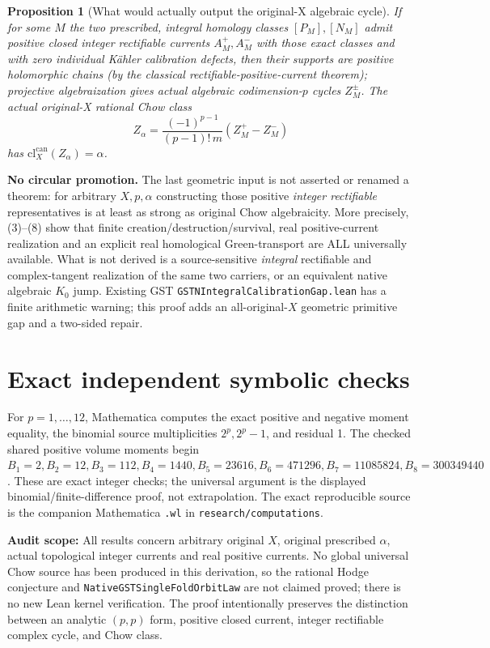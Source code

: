 \documentclass[11pt]{article}
\newtheorem{proposition}[theorem]{Proposition}
\begin{document}
\begin{proposition}[What would actually output the original-X algebraic cycle]
If for some \(M\) the two prescribed, integral homology classes \([P_M],[N_M]\) admit positive closed \emph{integer rectifiable} currents \(A_M^+,A_M^-\) with those exact classes and with zero individual K\"ahler calibration defects, then their supports are positive holomorphic chains (by the classical rectifiable-positive-current theorem); projective algebraization gives actual algebraic codimension-\(p\) cycles \(Z_M^\pm\). The \emph{actual original-X} rational Chow class
\[
\boxed{Z_\alpha=\frac{(-1)^{p-1}}{(p-1)!\,m}(Z_M^+-Z_M^-)}
\]
has \(\mathrm{cl}_X^{\mathrm{can}}(Z_\alpha)=\alpha\).
\end{proposition}
\noindent\textbf{No circular promotion.} The last geometric input is not asserted or renamed a theorem: for arbitrary \(X,p,\alpha\) constructing those positive \emph{integer rectifiable} representatives is at least as strong as original Chow algebraicity. More precisely, (3)--(8) show that finite creation/destruction/survival, real positive-current realization and an explicit real homological Green-transport are ALL universally available. What is not derived is a source-sensitive \emph{integral} rectifiable and complex-tangent realization of the same two carriers, or an equivalent native algebraic \(K_0\) jump. Existing GST \texttt{GSTNIntegralCalibrationGap.lean} has a finite arithmetic warning; this proof adds an all-original-\(X\) geometric primitive gap and a two-sided repair.

\section{Exact independent symbolic checks}
For \(p=1,\dots,12\), Mathematica computes the exact positive and negative moment equality, the binomial source multiplicities \(2^p,2^p-1\), and residual 1. The checked shared positive volume moments begin \(B_1=2,B_2=12,B_3=112,B_4=1440,B_5=23616,B_6=471296,B_7=11085824,B_8=300349440\). These are exact integer checks; the universal argument is the displayed binomial/finite-difference proof, not extrapolation. The exact reproducible source is the companion Mathematica \texttt{.wl} in \texttt{research/computations}.

\noindent\textbf{Audit scope:} All results concern arbitrary original \(X\), original prescribed \(\alpha\), actual topological integer currents and real positive currents. No global universal Chow source has been produced in this derivation, so the rational Hodge conjecture and \texttt{NativeGSTSingleFoldOrbitLaw} are not claimed proved; there is no new Lean kernel verification. The proof intentionally preserves the distinction between an analytic \((p,p)\) form, positive closed current, integer rectifiable complex cycle, and Chow class.
\end{document}
